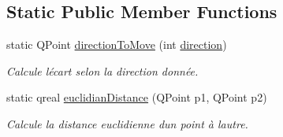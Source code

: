 \subsection*{Static Public Member Functions}
\begin{DoxyCompactItemize}
\item 
static Q\+Point \hyperlink{class_unit_a20108f02c092e52bf4c008a20370b9ef}{direction\+To\+Move} (int \hyperlink{class_unit_a5d8a5a789acfa4d2502b0c1082876172}{direction})
\begin{DoxyCompactList}\small\item\em Calcule l\textquotesingle{}écart selon la direction donnée. \end{DoxyCompactList}\item 
static qreal \hyperlink{class_unit_a4bbd8e88c7b2d16b25067ff2dedcb067}{euclidian\+Distance} (Q\+Point p1, Q\+Point p2)
\begin{DoxyCompactList}\small\item\em Calcule la distance euclidienne d\textquotesingle{}un point à l\textquotesingle{}autre. \end{DoxyCompactList}\end{DoxyCompactItemize}
